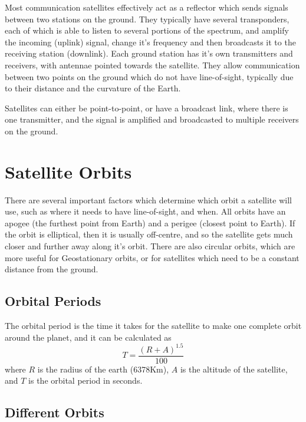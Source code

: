 
Most communication satellites effectively act as a reflector which sends signals between two stations on the ground.
 They typically have several transponders, each of which is able to listen to several portions of the spectrum, and
 amplify the incoming (uplink) signal, change it's frequency and then broadcasts it to the receiving station (downlink).
 Each ground station has it's own transmitters and receivers, with antennae pointed towards the satellite. They allow
 communication between two points on the ground which do not have line-of-sight, typically due to their distance and
 the curvature of the Earth.

Satellites can either be point-to-point, or have a broadcast link, where there is one transmitter, and the signal is
 amplified and broadcasted to multiple receivers on the ground.

\section*{Satellite Orbits}

There are several important factors which determine which orbit a satellite will use, such as where it needs to have
 line-of-sight, and when. All orbits have an apogee (the furthest point from Earth) and a perigee (closest point to
 Earth). If the orbit is elliptical, then it is usually off-centre, and so the satellite gets much closer and further
 away along it's orbit. There are also circular orbits, which are more useful for Geostationary orbits, or for
 satellites which need to be a constant distance from the ground.

\subsection*{Orbital Periods}

The orbital period is the time it takes for the satellite to make one complete orbit around the planet, and it can be
 calculated as
\begin{equation*}
  T = \frac{{(R + A)}^{1.5}}{100}
\end{equation*}
 where $R$ is the radius of the earth (6378Km), $A$ is the altitude of the satellite, and $T$ is the orbital period in
 seconds.

\subsection*{Different Orbits}

